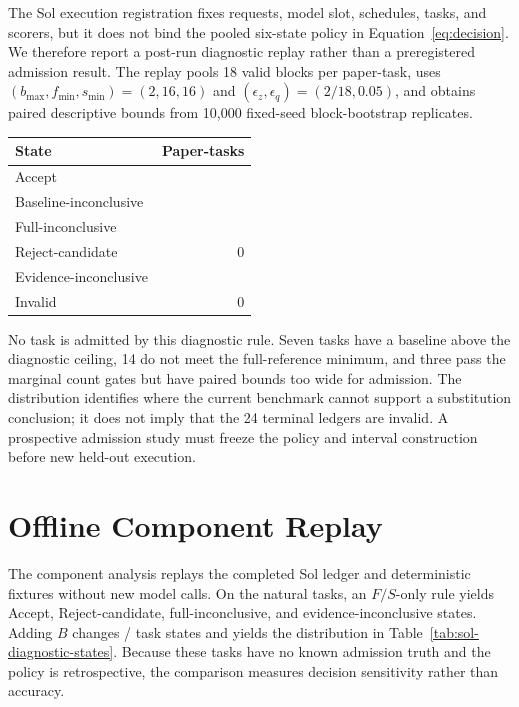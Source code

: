 The Sol execution registration fixes requests, model slot, schedules, tasks, and scorers, but it does not bind the pooled six-state policy in Equation~\ref{eq:decision}. We therefore report a post-run diagnostic replay rather than a preregistered admission result. The replay pools 18 valid blocks per paper-task, uses $(b_{\max},f_{\min},s_{\min})=(2,16,16)$ and $(\epsilon_z,\epsilon_q)=(2/18,0.05)$, and obtains paired descriptive bounds from 10,000 fixed-seed block-bootstrap replicates.

\begin{center}
\label{tab:sol-diagnostic-states}
\footnotesize
\setlength{\tabcolsep}{5pt}
\begin{tabular}{lr}
\toprule
State & Paper-tasks \\
\midrule
Accept & \SolStrictAccept{} \\
Baseline-inconclusive & \SolBaselineInconclusive{} \\
Full-inconclusive & \SolFullInconclusive{} \\
Reject-candidate & 0 \\
Evidence-inconclusive & \SolEvidenceInconclusive{} \\
Invalid & 0 \\
\bottomrule
\end{tabular}
\end{center}

No task is admitted by this diagnostic rule. Seven tasks have a baseline above the diagnostic ceiling, 14 do not meet the full-reference minimum, and three pass the marginal count gates but have paired bounds too wide for admission. The distribution identifies where the current benchmark cannot support a substitution conclusion; it does not imply that the 24 terminal ledgers are invalid. A prospective admission study must freeze the policy and interval construction before new held-out execution.

\section{Offline Component Replay}
\label{app:component-ablation}

The component analysis replays the completed Sol ledger and deterministic fixtures without new model calls. On the natural tasks, an $F/S$-only rule yields \AblationFSAccept{} Accept, \AblationFSReject{} Reject-candidate, \AblationFSInconclusiveFull{} full-inconclusive, and \AblationFSInconclusiveEvidence{} evidence-inconclusive states. Adding $B$ changes \AblationBChangedTasks{}/\PrimaryTasks{} task states and yields the distribution in Table~\ref{tab:sol-diagnostic-states}. Because these tasks have no known admission truth and the policy is retrospective, the comparison measures decision sensitivity rather than accuracy.

